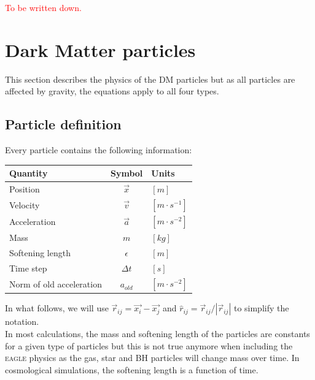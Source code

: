 \documentclass[a4paper,10pt]{report}
\newcommand{\eagle}{\textsc{eagle }}
\begin{document}
\textcolor{red}{To be written down.}












\chapter{Dark Matter particles}
\label{chap:DMs}

This section describes the physics of the DM particles but as all particles are affected by gravity, the equations
apply to all four types. 


\section{Particle definition}
Every particle contains the following information:

\begin{table}[h]
\centering
\begin{tabular}{|l|c|l|}
 \hline
 \textbf{Quantity}  & \textbf{Symbol} & \textbf{Units} \\
 \hline \hline
 Position & $\vec{x}$ & $[m]$ \\
 Velocity &$\vec{v}$ & $[m\cdot s^{-1}]$ \\
 Acceleration &$\vec{a}$ & $[m\cdot s^{-2}]$ \\
 Mass & $m$ & $[kg]$ \\
 Softening length & $\epsilon$ & $[m]$ \\
 Time step & $\Delta t$ & $[s]$ \\
 Norm of old acceleration & $a_{old}$ & $[m\cdot s^{-2}]$ \\
\hline
\end{tabular} 
\end{table}


In what follows, we will use $\vec{r}_{ij} = \vec{x_i} - \vec{x_j}$ and $\hat{r}_{ij} = \vec{r}_{ij}/|\vec{r}_{ij}|$
to simplify the notation.\\
In most calculations, the mass and softening length of the particles are constants for a given type of particles but
this is not true anymore when including the \eagle physics as the gas, star and BH particles will change mass over
time. In cosmological simulations, the softening length is a function of time.
\end{document}

